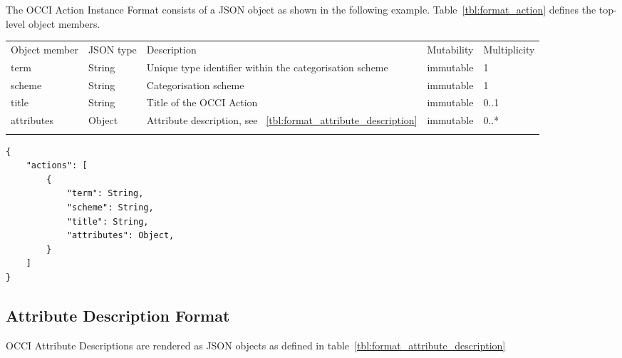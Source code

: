 \documentclass[10pt,a4paper]{article}
\begin{document}
The OCCI Action Instance Format consists of a JSON object as shown in the
following example.
Table~\ref{tbl:format_action} defines the top-level object members.

 {
    \begin{tabularx}{\textwidth}{llXll}
    \toprule
    Object member & JSON type & Description & Mutability & Multiplicity \\
    \colrule
    term & String & Unique type identifier within the categorisation scheme &
immutable & 1 \\

    scheme & String & Categorisation scheme & immutable & 1 \\
    
    title & String & Title of the OCCI Action & immutable & 0..1 \\
    
    attributes & Object & Attribute description, see
~\ref{tbl:format_attribute_description} & immutable & 0..* \\
    \botrule
    \end{tabularx}
}

\begin{lstlisting}
{
    "actions": [
        {
            "term": String,
            "scheme": String,
            "title": String,
            "attributes": Object,
        }
    ]
}
\end{lstlisting}

\subsection{Attribute Description Format}
\label{sec:format_attribute_description}

OCCI Attribute Descriptions are rendered as JSON objects as defined in table~\ref{tbl:format_attribute_description}
\end{document}
